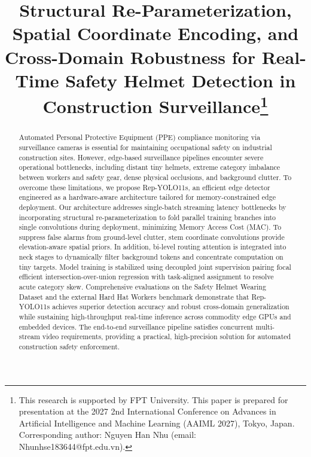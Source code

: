 \documentclass[conference]{IEEEtran}
\begin{document}
\title{Structural Re-Parameterization, Spatial Coordinate Encoding, and Cross-Domain Robustness for Real-Time Safety Helmet Detection in Construction Surveillance\thanks{This research is supported by FPT University. This paper is prepared for presentation at the 2027 2nd International Conference on Advances in Artificial Intelligence and Machine Learning (AAIML 2027), Tokyo, Japan. Corresponding author: Nguyen Han Nhu (email: Nhunhse183644@fpt.edu.vn).}}

\author{
}

\maketitle

\begin{abstract}
Automated Personal Protective Equipment (PPE) compliance monitoring via surveillance cameras is essential for maintaining occupational safety on industrial construction sites. However, edge-based surveillance pipelines encounter severe operational bottlenecks, including distant tiny helmets, extreme category imbalance between workers and safety gear, dense physical occlusions, and background clutter. To overcome these limitations, we propose Rep-YOLO11s, an efficient edge detector engineered as a hardware-aware architecture tailored for memory-constrained edge deployment. Our architecture addresses single-batch streaming latency bottlenecks by incorporating structural re-parameterization to fold parallel training branches into single convolutions during deployment, minimizing Memory Access Cost (MAC). To suppress false alarms from ground-level clutter, stem coordinate convolutions provide elevation-aware spatial priors. In addition, bi-level routing attention is integrated into neck stages to dynamically filter background tokens and concentrate computation on tiny targets. Model training is stabilized using decoupled joint supervision pairing focal efficient intersection-over-union regression with task-aligned assignment to resolve acute category skew. Comprehensive evaluations on the Safety Helmet Wearing Dataset and the external Hard Hat Workers benchmark demonstrate that Rep-YOLO11s achieves superior detection accuracy and robust cross-domain generalization while sustaining high-throughput real-time inference across commodity edge GPUs and embedded devices. The end-to-end surveillance pipeline satisfies concurrent multi-stream video requirements, providing a practical, high-precision solution for automated construction safety enforcement.
\end{abstract}
\end{document}
